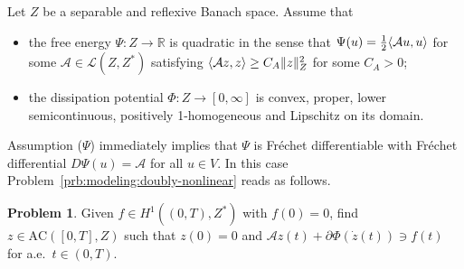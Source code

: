 \documentclass[a4paper,10pt,twoside]{amsbook}
\numberwithin{section}{chapter}
\numberwithin{equation}{chapter}
\theoremstyle{definition}
\newtheorem{prb}[prop]{Problem}
\DeclarePairedDelimiter{\norm}{\lVert}{\rVert}
\DeclarePairedDelimiter{\dual}{\langle}{\rangle}
\begin{document}
Let $Z$ be a separable and reflexive Banach space. Assume that 
\begin{itemize}
\item[($\Psi$)] the free energy $\Psi\colon Z\to\mathbb{R}$ is quadratic in the sense that $\Psi(u)=\frac{1}{2}\dual{\mathcal{A}u,u}$ for some $\mathcal{A}\in\mathscr{L}(Z,Z^*)$ satisfying $\dual{\mathcal{A}z,z}\ge C_A\norm{z}_Z^2$ for some $C_A>0$;
\item[($\Phi$)] the dissipation potential $\Phi\colon Z\to[0,\infty]$ is convex, proper, lower semicontinuous, positively 1-homogeneous and Lipschitz on its domain.
\end{itemize}
Assumption ($\Psi$) immediately implies that $\Psi$ is Fréchet differentiable with Fréchet differential $D\Psi(u)=\mathcal{A}$ for all $u\in V$. In this case Problem~\ref{prb:modeling:doubly-nonlinear} reads as follows.
\begin{prb}
\label{prb:evi}
Given $f\in H^1((0,T),Z^*)$ with $f(0)=0$, find $z\in\text{AC}([0,T],Z)$ such that $z(0)=0$ and $\mathcal{A}z(t)+\partial\Phi(\dot z(t))\ni f(t)$
for a.e.\ $t\in(0,T)$.
\end{prb}
\end{document}
